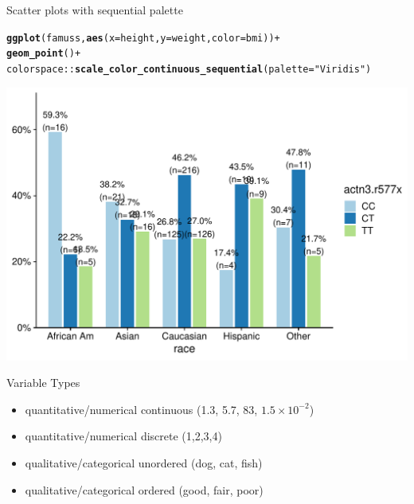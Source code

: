 \documentclass[10pt]{beamer}\usepackage[]{graphicx}\usepackage[]{color}
\makeatletter
\def\maxwidth{ %
  \ifdim\Gin@nat@width>\linewidth
    \linewidth
  \else
    \Gin@nat@width
  \fi
}
\newcommand{\hlstr}[1]{\textcolor[rgb]{0.192,0.494,0.8}{#1}}%
\newcommand{\hlopt}[1]{\textcolor[rgb]{0,0,0}{#1}}%
\newcommand{\hlstd}[1]{\textcolor[rgb]{0.345,0.345,0.345}{#1}}%
\newcommand{\hlkwc}[1]{\textcolor[rgb]{0.333,0.667,0.333}{#1}}%
\newcommand{\hlkwd}[1]{\textcolor[rgb]{0.737,0.353,0.396}{\textbf{#1}}}%
\newenvironment{kframe}{%
 \def\at@end@of@kframe{}%
 \ifinner\ifhmode%
  \def\at@end@of@kframe{\end{minipage}}%
  \begin{minipage}{\columnwidth}%
 \fi\fi%
 \def\FrameCommand##1{\hskip\@totalleftmargin \hskip-\fboxsep
 \colorbox{shadecolor}{##1}\hskip-\fboxsep
     \hskip-\linewidth \hskip-\@totalleftmargin \hskip\columnwidth}%
 \MakeFramed {\advance\hsize-\width
   \@totalleftmargin\z@ \linewidth\hsize
   \@setminipage}}%
 {\par\unskip\endMakeFramed%
 \at@end@of@kframe}
\newenvironment{knitrout}{}{} %
\makeatother
\begin{document}
	\begin{frame}[fragile]{Scatter plots with sequential palette}
\begin{knitrout}\tiny
{}\color{fgcolor}\begin{kframe}
\begin{alltt}
\hlkwd{ggplot}\hlstd{(famuss,} \hlkwd{aes}\hlstd{(}\hlkwc{x} \hlstd{= height,} \hlkwc{y} \hlstd{= weight,} \hlkwc{color} \hlstd{= bmi))} \hlopt{+}
\hlkwd{geom_point}\hlstd{()} \hlopt{+}
\hlstd{colorspace}\hlopt{::}\hlkwd{scale_color_continuous_sequential}\hlstd{(}\hlkwc{palette} \hlstd{=} \hlstr{"Viridis"}\hlstd{)}
\end{alltt}
\end{kframe}

{\centering \includegraphics[width=\maxwidth]{figure/unnamed-chunk-3-1} 

}



\end{knitrout}
\end{frame}



\begin{frame}{Variable Types}
	\begin{itemize}
		\setlength\itemsep{1.5em}
		\item quantitative/numerical continuous (1.3, 5.7, 83, $1.5\times 10^{-2}$)
		\item quantitative/numerical discrete (1,2,3,4)
		\item qualitative/categorical unordered (dog, cat, fish)
		\item qualitative/categorical ordered (good, fair, poor)
	\end{itemize}
	
	
	
\end{frame}
\end{document}
